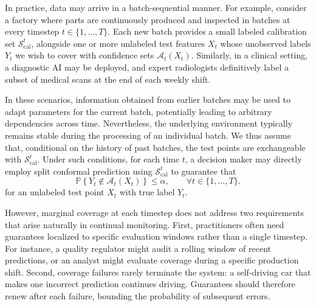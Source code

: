 \documentclass{uai2026} %
\newcommand{\1}{\mathbf{1}}
\newcommand{\prob}{\mathbb{P}}
\newcommand{\scal}{\mathcal{S}}
\newcommand{\ens}[1]{\left\{#1\right\}}
\newcommand{\cali}{\mathrm{cal}}
\newcommand{\scalcal}{\scal_{\cali}}
\newcommand{\acal}{\mathcal{A}}
\begin{document}
In practice, data may arrive in a batch-sequential manner. For example, consider a factory where parts are continuously produced and inspected in batches at every timestep $t\in\{1,\dots,T\}$. Each new batch provides a small labeled calibration set $\scalcal^t$, alongside one or more unlabeled test features $X_t$ whose unobserved labels $Y_t$ we wish to cover with confidence sets $\acal_t(X_t)$. Similarly, in a clinical setting, a diagnostic AI may be deployed, and expert radiologists definitively label a subset of medical scans at the end of each weekly shift.

In these scenarios, information obtained from earlier batches may be used to adapt parameters for the current batch, potentially leading to arbitrary dependencies across time. Nevertheless, the underlying environment typically remains stable during the processing of an individual batch. We thus assume that, conditional on the history of past batches, the test points are exchangeable with $\scalcal^t$. Under such conditions, for each time $t$, a decision maker may directly employ split conformal prediction using $\scalcal^t$ to guarantee that
\begin{equation}
  \label{eq:marginal_horizon}
  \prob\ens{Y_t\not\in \acal_t(X_t)}\le \alpha,\qquad \forall t\in\{1,\dots,T\}.
\end{equation}
for an unlabeled test point $X_t$ with true label $Y_t$.

However, marginal coverage at each timestep does not address two requirements that arise naturally in continual monitoring.
First, practitioners often need guarantees localized to specific evaluation windows rather than a single timestep.
For instance, a quality regulator might audit a rolling window of recent predictions, or an analyst might evaluate coverage during a specific production shift.
Second, coverage failures rarely terminate the system: a self-driving car that makes one incorrect prediction continues driving.
Guarantees should therefore renew after each failure, bounding the probability of subsequent errors.
\end{document}
